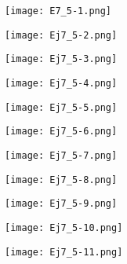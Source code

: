 \documentclass{article}
\begin{document}
\begin{figure}[]
\begin{subfigure}{.23\textwidth}
  \centering
  \texttt{[image: E7\_5-1.png]}  
  \caption{ }
  \label{sb11-1}
\end{subfigure}
\begin{subfigure}{.23\textwidth}
  \centering
  \texttt{[image: Ej7\_5-2.png]}  
  \caption{ }
  \label{sb11-2}
\end{subfigure}
\begin{subfigure}{.23\textwidth}
  \centering
  \texttt{[image: Ej7\_5-3.png]}  
  \caption{ }
  \label{sb11-3}
\end{subfigure}
\begin{subfigure}{.23\textwidth}
  \centering
  \texttt{[image: Ej7\_5-4.png]}  
  \caption{ }
  \label{sb11-4}
\end{subfigure}
\newline
\begin{subfigure}{.23\textwidth}
  \centering
  \texttt{[image: Ej7\_5-5.png]}  
  \caption{ }
  \label{sb11-5}
\end{subfigure}
\begin{subfigure}{.23\textwidth}
  \centering
  \texttt{[image: Ej7\_5-6.png]}  
  \caption{ }
  \label{sb11-6}
\end{subfigure}
\begin{subfigure}{.23\textwidth}
  \centering
  \texttt{[image: Ej7\_5-7.png]}  
  \caption{ }
  \label{sb11-7}
\end{subfigure}
\begin{subfigure}{.23\textwidth}
  \centering
  \texttt{[image: Ej7\_5-8.png]}  
  \caption{ }
  \label{sb11-8}
\end{subfigure}
\newline
\begin{subfigure}{.23\textwidth}
  \centering
  \texttt{[image: Ej7\_5-9.png]}  
  \caption{ }
  \label{sb11-9}
\end{subfigure}
\begin{subfigure}{.23\textwidth}
  \centering
  \texttt{[image: Ej7\_5-10.png]}  
  \caption{ }
  \label{sb11-10}
\end{subfigure}
\begin{subfigure}{.23\textwidth}
  \centering
  \texttt{[image: Ej7\_5-11.png]}  
  \caption{ }
  \label{sb11-11}
\end{subfigure}

\end{figure}
\end{document}
